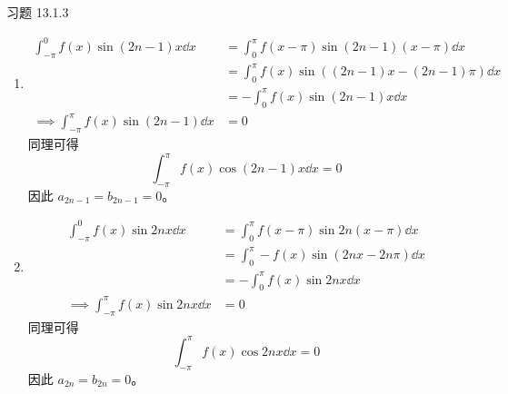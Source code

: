 \begin{problem}
    习题 13.1.3
    \begin{solution}
        \begin{enumerate}
            \item[\textbf{1)}]
            $$
            \begin{aligned}
                \int_{-\pi}^{0} f(x) \sin (2n - 1)x \dd{x} & = \int_{0}^{\pi} f(x - \pi) \sin (2n - 1) (x - \pi) \dd{x} \\
                & = \int_{0}^{\pi} f(x) \sin ((2n - 1) x - (2n - 1)\pi) \dd{x} \\
                & = -\int_{0}^{\pi} f(x) \sin (2n - 1) x \dd{x} \\
                \implies \int_{-\pi}^{\pi} f(x) \sin (2n - 1) \dd{x} & = 0
            \end{aligned}
            $$
            同理可得
            $$
            \int_{-\pi}^{\pi} f(x) \cos (2n - 1) x \dd{x} = 0
            $$
            因此 $a_{2n - 1} = b_{2n - 1} = 0$。

            \item[\textbf{2)}]
            $$
            \begin{aligned}
                \int_{-\pi}^{0} f(x) \sin 2n x \dd{x} & = \int_{0}^{\pi} f(x - \pi) \sin 2n (x - \pi) \dd{x} \\
                & = \int_{0}^{\pi} -f(x) \sin (2n x - 2n \pi) \dd{x} \\
                & = -\int_{0}^{\pi} f(x) \sin 2n x \dd{x} \\
                \implies \int_{-\pi}^{\pi} f(x) \sin 2n x \dd{x} & = 0
            \end{aligned}
            $$
            同理可得
            $$
            \int_{-\pi}^{\pi} f(x) \cos 2n x \dd{x} = 0
            $$
            因此 $a_{2n} = b_{2n} = 0$。
        \end{enumerate}
    \end{solution}
\end{problem}

